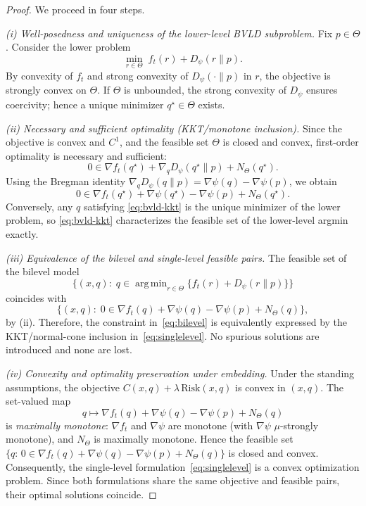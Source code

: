 \documentclass[10pt,a4paper]{amsart}
\DeclareMathOperator*{\argmin}{arg\,min}
\begin{document}
\begin{proof}
We proceed in four steps.

\emph{(i) Well-posedness and uniqueness of the lower-level BVLD subproblem.}
Fix $p\in\Theta$. Consider the lower problem 
\[
\min_{r\in\Theta}\; f_t(r)+D_\psi(r\|p).
\]
By convexity of $f_t$ and strong convexity of $D_\psi(\cdot\|p)$ in $r$, 
the objective is strongly convex on $\Theta$.  
If $\Theta$ is unbounded, the strong convexity of $D_\psi$ ensures coercivity; 
hence a unique minimizer $q^\star\in\Theta$ exists.

\emph{(ii) Necessary and sufficient optimality (KKT/monotone inclusion).}
Since the objective is convex and $C^1$, and the feasible set $\Theta$ is closed and convex,
first-order optimality is necessary and sufficient:
\[
0\in \nabla f_t(q^\star)+\nabla_q D_\psi(q^\star\|p)+N_\Theta(q^\star).
\]
Using the Bregman identity $\nabla_q D_\psi(q\|p)=\nabla\psi(q)-\nabla\psi(p)$, 
we obtain
\begin{equation}\label{eq:bvld-kkt}
0\in\nabla f_t(q^\star)+\nabla\psi(q^\star)-\nabla\psi(p)+N_\Theta(q^\star).
\end{equation}
Conversely, any $q$ satisfying \eqref{eq:bvld-kkt} 
is the unique minimizer of the lower problem, 
so \eqref{eq:bvld-kkt} characterizes the feasible set of the lower-level argmin exactly.

\emph{(iii) Equivalence of the bilevel and single-level feasible pairs.}
The feasible set of the bilevel model
\[
\big\{(x,q):\; q\in\argmin_{r\in\Theta}\{f_t(r)+D_\psi(r\|p)\}\big\}
\]
coincides with
\[
\big\{(x,q):\; 0\in\nabla f_t(q)+\nabla\psi(q)-\nabla\psi(p)+N_\Theta(q)\big\},
\]
by (ii).  
Therefore, the constraint in~\eqref{eq:bilevel} 
is equivalently expressed by the KKT/normal-cone inclusion 
in~\eqref{eq:singlelevel}.  
No spurious solutions are introduced and none are lost.

\emph{(iv) Convexity and optimality preservation under embedding.}
Under the standing assumptions, 
the objective $C(x,q)+\lambda\,\mathrm{Risk}(x,q)$ is convex in $(x,q)$.  
The set-valued map
\[
q\mapsto\nabla f_t(q)+\nabla\psi(q)-\nabla\psi(p)+N_\Theta(q)
\]
is \emph{maximally monotone}: $\nabla f_t$ and $\nabla\psi$ are monotone 
(with $\nabla\psi$ $\mu$-strongly monotone), and $N_\Theta$ is maximally monotone.  
Hence the feasible set
\(
\{q:\,0\in\nabla f_t(q)+\nabla\psi(q)-\nabla\psi(p)+N_\Theta(q)\}
\)
is closed and convex.  
Consequently, the single-level formulation~\eqref{eq:singlelevel} 
is a convex optimization problem.  
Since both formulations share the same objective and feasible pairs, 
their optimal solutions coincide.  
\end{proof}
\end{document}
